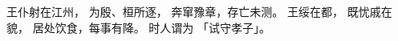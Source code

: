 
\switchcolumn*[\section{}]

王仆射在江州，
为殷、桓所逐，
奔窜豫章，存亡未测。
王绥在都，
既忧戚在貌，
居处饮食，每事有降。
时人谓为
「试守孝子」。

\switchcolumn



